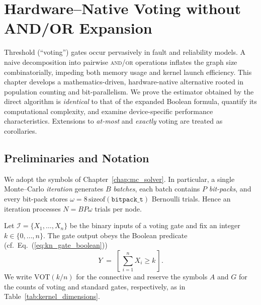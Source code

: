 \chapter{Hardware--Native Voting without AND/OR Expansion}
\label{chap:voter}

Threshold (``voting'') gates occur pervasively in fault
and reliability models.  A naive decomposition into pairwise \textsc{and}/\textsc{or}
operations inflates the graph size combinatorially, impeding both memory usage
and kernel launch efficiency.  This chapter develops a mathematics-driven,
hardware-native alternative rooted in population counting and bit-parallelism.
We prove the estimator obtained by the direct algorithm is \emph{identical} to
that of the expanded Boolean formula, quantify its computational complexity,
and examine device-specific performance characteristics.  Extensions to
\emph{at-most} and \emph{exactly} voting are treated as corollaries.

\section{Preliminaries and Notation}
\label{sec:voter_prelims}

We adopt the symbols of Chapter~\ref{chap:mc_solver}.  In particular, a single
Monte–Carlo \emph{iteration} generates $B$ \emph{batches}, each batch contains
$P$ \emph{bit-packs}, and every bit-pack stores $\omega=8\,\mathrm{sizeof}(\texttt{bitpack\_t})$
Bernoulli trials.  Hence an iteration processes
\(
  N = B P \omega
\)
trials per node.

Let $\mathcal{I}=\{X_1,\dots,X_n\}$ be the binary inputs of a voting gate and
fix an integer $k\in\{0,\dots,n\}$.  The gate output obeys the Boolean
predicate (cf.~Eq.~(\ref{eq:kn_gate_boolean}))
\[
  Y\;=\;[\,\sum_{i=1}^{n} X_i \ge k\,].
\]
We write $\mathrm{VOT}(k/n)$ for the connective and reserve the symbols
$A$ and $G$ for the counts of voting and standard gates, respectively, as in
Table~\ref{tab:kernel_dimensions}.

